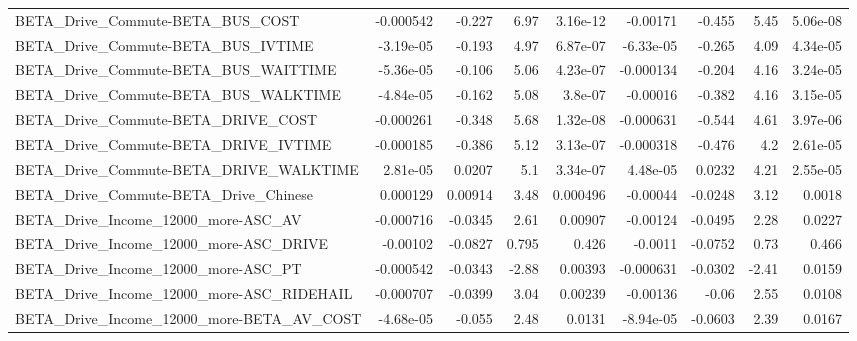 \begin{tabular}{lrrrrrrrr}
BETA\_Drive\_Commute-BETA\_BUS\_COST                   &   -0.000542 &       -0.227 &     6.97 & 3.16e-12 &   -0.00171 &      -0.455 &         5.45 &      5.06e-08 \\
BETA\_Drive\_Commute-BETA\_BUS\_IVTIME                 &   -3.19e-05 &       -0.193 &     4.97 & 6.87e-07 &  -6.33e-05 &      -0.265 &         4.09 &      4.34e-05 \\
BETA\_Drive\_Commute-BETA\_BUS\_WAITTIME               &   -5.36e-05 &       -0.106 &     5.06 & 4.23e-07 &  -0.000134 &      -0.204 &         4.16 &      3.24e-05 \\
BETA\_Drive\_Commute-BETA\_BUS\_WALKTIME               &   -4.84e-05 &       -0.162 &     5.08 &  3.8e-07 &   -0.00016 &      -0.382 &         4.16 &      3.15e-05 \\
BETA\_Drive\_Commute-BETA\_DRIVE\_COST                 &   -0.000261 &       -0.348 &     5.68 & 1.32e-08 &  -0.000631 &      -0.544 &         4.61 &      3.97e-06 \\
BETA\_Drive\_Commute-BETA\_DRIVE\_IVTIME               &   -0.000185 &       -0.386 &     5.12 & 3.13e-07 &  -0.000318 &      -0.476 &          4.2 &      2.61e-05 \\
BETA\_Drive\_Commute-BETA\_DRIVE\_WALKTIME             &    2.81e-05 &       0.0207 &      5.1 & 3.34e-07 &   4.48e-05 &      0.0232 &         4.21 &      2.55e-05 \\
BETA\_Drive\_Commute-BETA\_Drive\_Chinese              &    0.000129 &      0.00914 &     3.48 & 0.000496 &   -0.00044 &     -0.0248 &         3.12 &        0.0018 \\
BETA\_Drive\_Income\_12000\_more-ASC\_AV                &   -0.000716 &      -0.0345 &     2.61 &  0.00907 &   -0.00124 &     -0.0495 &         2.28 &        0.0227 \\
BETA\_Drive\_Income\_12000\_more-ASC\_DRIVE             &    -0.00102 &      -0.0827 &    0.795 &    0.426 &    -0.0011 &     -0.0752 &         0.73 &         0.466 \\
BETA\_Drive\_Income\_12000\_more-ASC\_PT                &   -0.000542 &      -0.0343 &    -2.88 &  0.00393 &  -0.000631 &     -0.0302 &        -2.41 &        0.0159 \\
BETA\_Drive\_Income\_12000\_more-ASC\_RIDEHAIL          &   -0.000707 &      -0.0399 &     3.04 &  0.00239 &   -0.00136 &       -0.06 &         2.55 &        0.0108 \\
BETA\_Drive\_Income\_12000\_more-BETA\_AV\_COST          &   -4.68e-05 &       -0.055 &     2.48 &   0.0131 &  -8.94e-05 &     -0.0603 &         2.39 &        0.0167 \\

\end{tabular}
